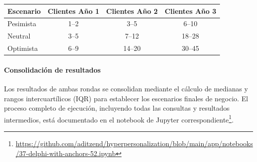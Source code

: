 \begin{center}
\footnotesize
\begin{tabular}{|l|c|c|c|}
\hline
\textbf{Escenario} & \textbf{Clientes Año 1} & \textbf{Clientes Año 2} & \textbf{Clientes Año 3} \\
\hline
Pesimista & 1--2 & 3--5 & 6--10 \\
\hline
Neutral & 3--5 & 7--12 & 18--28 \\
\hline
Optimista & 6--9 & 14--20 & 30--45 \\
\hline
\end{tabular}
\end{center}

\paragraph{Consolidación de resultados}

Los resultados de ambas rondas se consolidan mediante el cálculo de medianas y rangos intercuartílicos (IQR) para establecer los escenarios finales de negocio. El proceso completo de ejecución, incluyendo todas las consultas y resultados intermedios, está documentado en el notebook de Jupyter correspondiente\footnote{\url{https://github.com/aditzend/hyperpersonalization/blob/main/app/notebooks/37-delphi-with-anchors-52.ipynb}}.
